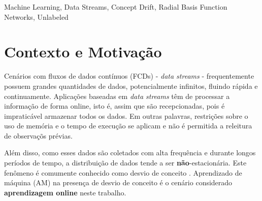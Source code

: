\documentclass[qual, classic, a4paper]{ufbathesis}
\begin{document}
\abstract

\blindtext

\begin{keywords}
    Machine Learning, Data Streams, Concept Drift, Radial Basis Function Networks, Unlabeled
\end{keywords}


\tableofcontents

\listoffigures

\listoftables

\mainmatter

% 
% 
% 
%

 \label{introducao}

\section{Contexto e Motivação}

Cenários com fluxos de dados contínuos (FCDs) - \textit{data streams} - frequentemente possuem grandes quantidades de dados, potencialmente infinitos, fluindo rápida e continuamente. Aplicações baseadas em \textit{data streams} têm de processar a informação de forma online, isto é, assim que são recepcionadas, pois é impraticável armazenar todos os dados. Em outras palavras, restrições sobre o uso de memória e o tempo de execução se aplicam e não é permitida a releitura de observaçõs prévias.

Além disso, como esses dados são coletados com alta frequência e durante longos períodos de tempo, a distribuição de dados tende a ser \textbf{não}-estacionária. 
Este fenômeno é comumente conhecido como desvio de conceito \cite{Gama:2014:SCD:2597757.2523813}. Aprendizado de máquina (AM) na presença de desvio de conceito é o cenário considerado \textbf{aprendizagem online} neste trabalho.
\end{document}
